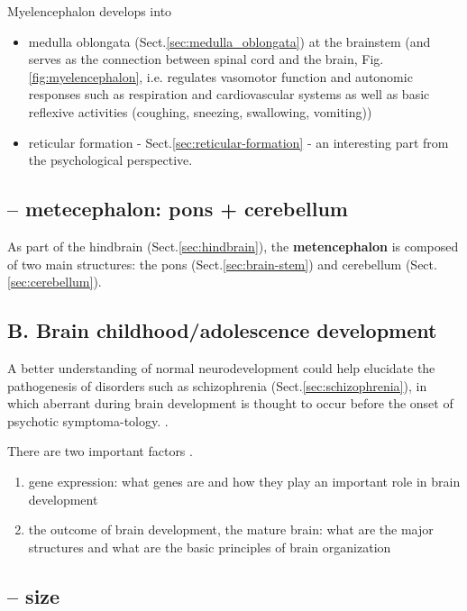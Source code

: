 Myelencephalon develops into 
\begin{itemize}

  \item   medulla oblongata (Sect.\ref{sec:medulla_oblongata}) at the brainstem
  (and serves as the connection between spinal cord and the brain, Fig.\ref{fig:myelencephalon},
i.e. regulates vasomotor function and autonomic responses such as respiration
and cardiovascular systems as well as basic reflexive activities (coughing,
sneezing, swallowing, vomiting))
  
  \item reticular formation - Sect.\ref{sec:reticular-formation} - an
  interesting part from the psychological perspective.
\end{itemize}

 
 
\subsection{--  metecephalon: pons + cerebellum}
\label{sec:metencephalon}

As part of the hindbrain (Sect.\ref{sec:hindbrain}), the {\bf  metencephalon} is
composed of two main structures: the pons (Sect.\ref{sec:brain-stem}) and
cerebellum (Sect.\ref{sec:cerebellum}).

\subsection{B. Brain childhood/adolescence development}
\label{sec:brain-children}

A better understanding of normal neurodevelopment could help elucidate the
pathogenesis of disorders such as schizophrenia (Sect.\ref{sec:schizophrenia}),
in which aberrant during brain development is thought to occur before the onset
of psychotic symptoma-tology.
\citep{sowell2002}.

There are two important factors \citep{stiles2010}.  
\begin{enumerate}
  \item  gene expression: what genes are and how they play an important role in
  brain development
  
  \item the outcome of brain development, the mature brain: what are the major
  structures and what are the basic principles of brain organization
\end{enumerate}

\subsection{-- size}


